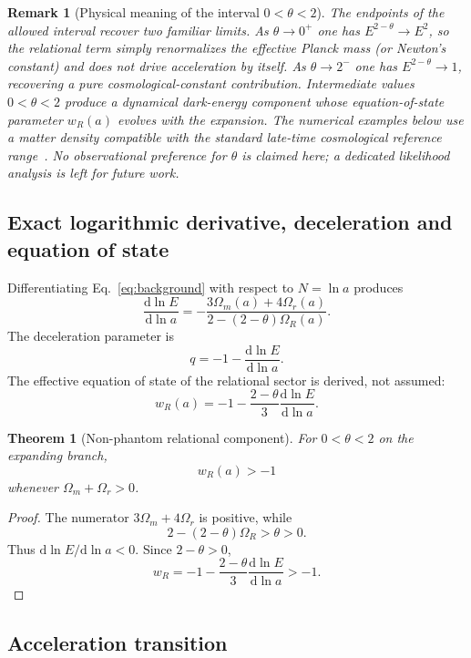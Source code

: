 \documentclass[11pt,a4paper]{article}
\newtheorem{theorem}[axiom]{Theorem}
\newtheorem{remark}[axiom]{Remark}
\renewcommand{\dd}{\mathrm{d}}
\newcommand{\Boxed}[1]{\boxed{\displaystyle #1}}
\begin{document}
\begin{remark}[Physical meaning of the interval \(0<\theta<2\)]
The endpoints of the allowed interval recover two familiar limits. As \(\theta\to0^+\) one has \(E^{2-\theta}\to E^2\), so the relational term simply renormalizes the effective Planck mass (or Newton's constant) and does not drive acceleration by itself. As \(\theta\to2^-\) one has \(E^{2-\theta}\to1\), recovering a pure cosmological-constant contribution. Intermediate values \(0<\theta<2\) produce a dynamical dark-energy component whose equation-of-state parameter \(w_R(a)\) evolves with the expansion. The numerical examples below use a matter density compatible with the standard late-time cosmological reference range~\cite{Planck}. No observational preference for \(\theta\) is claimed here; a dedicated likelihood analysis is left for future work.
\end{remark}

\subsection{Exact logarithmic derivative, deceleration and equation of state}

Differentiating Eq.~\eqref{eq:background} with respect to \(N=\ln a\) produces
\begin{equation}
\frac{\dd\ln E}{\dd\ln a}=-\frac{3\Omega_m(a)+4\Omega_r(a)}{2-(2-\theta)\Omega_R(a)}.
\end{equation}
The deceleration parameter is
\[
q=-1-\frac{\dd\ln E}{\dd\ln a}.
\]
The effective equation of state of the relational sector is derived, not assumed:
\begin{equation}
\Boxed{w_R(a)=-1-\frac{2-\theta}{3}\frac{\dd\ln E}{\dd\ln a}.}
\end{equation}
\begin{theorem}[Non-phantom relational component]
For \(0<\theta<2\) on the expanding branch,
\[
w_R(a)>-1
\]
whenever \(\Omega_m+\Omega_r>0\).
\end{theorem}
\begin{proof}
The numerator \(3\Omega_m+4\Omega_r\) is positive, while
\[
2-(2-\theta)\Omega_R>\theta>0.
\]
Thus \(\dd\ln E/\dd\ln a<0\). Since \(2-\theta>0\),
\[
w_R
=
-1-\frac{2-\theta}{3}\frac{\dd\ln E}{\dd\ln a}
>-1.
\]
\end{proof}

\subsection{Acceleration transition}
\end{document}
